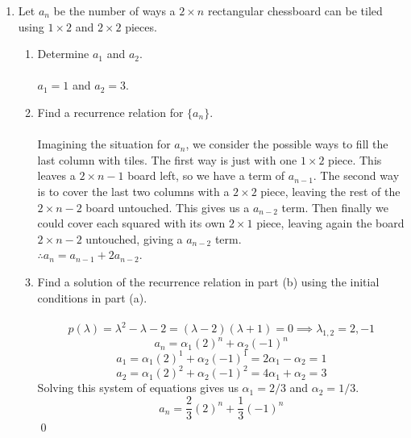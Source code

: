 \documentclass[12pt]{article}
\begin{document}
\begin{enumerate}
\item Let $a_n$ be the number of ways a $2 \times n$ rectangular chessboard can be tiled using $1 \times 2$ and $2 \times 2$ pieces. 
\begin{enumerate}
\item Determine $a_1$ and $a_2$.\\\\
$a_1 = 1$ and $a_2 = 3$.
\item Find a recurrence relation for $\{a_n\}$.\\\\
Imagining the situation for $a_n$, we consider the possible ways to fill the last column with tiles. The first way is just with one $1\times2$ piece. This leaves a $2\times n-1$ board left, so we have a term of $a_{n-1}$. The second way is to cover the last two columns with a $2 \times 2$ piece, leaving the rest of the $2 \times n-2$ board untouched. This gives us a $a_{n-2}$ term. Then finally we could cover each squared with its own $2 \times 1$ piece, leaving again the board $2 \times n-2$ untouched, giving a $a_{n-2}$ term.\\
$\therefore a_n = a_{n-1} + 2a_{n-2}$.
\item Find a solution of the recurrence relation in part (b) using the initial conditions in part (a).\\\\
\[p(\lambda) = \lambda^2 - \lambda - 2 = (\lambda-2)(\lambda+1) = 0 \implies \lambda_{1,2} = 2,-1\]
\[a_n = \alpha_1(2)^n + \alpha_2(-1)^n \]
\[a_1 = \alpha_1(2)^1 + \alpha_2(-1)^1 = 2\alpha_1 - \alpha_2 = 1\]
\[a_2 = \alpha_1(2)^2 + \alpha_2(-1)^2 = 4\alpha_1 + \alpha_2 = 3\]
Solving this system of equations gives us $\alpha_1 = 2/3$ and $\alpha_2 = 1/3$.\\
\[a_n = \frac{2}{3}(2)^n + \frac{1}{3}(-1)^n\]\qed
\end{enumerate}

\medskip

\end{enumerate}
\end{document}
